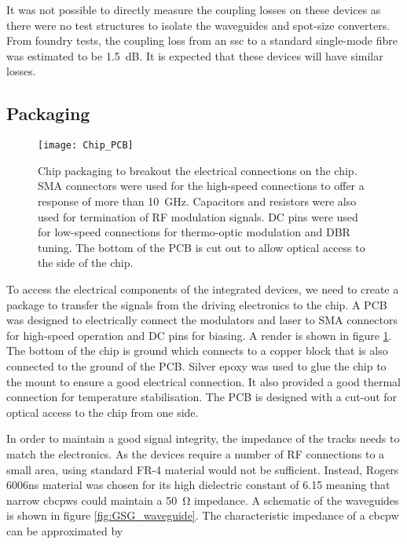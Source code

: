 It was not possible to directly measure the coupling losses on these devices as there were no test structures to isolate the waveguides and spot-size converters. From foundry tests, the coupling loss from an \ac{ssc} to a standard single-mode fibre was estimated to be \SI{1.5}{dB}. It is expected that these devices will have similar losses.

\subsection{Packaging}

\begin{figure}[t]
	\centering
	\texttt{[image: Chip\_PCB]}
	\caption[Transmitter PCB package]{Chip packaging to breakout the electrical connections on the chip. SMA connectors were used for the high-speed connections to offer a response of more than \SI{10}{\GHz}. Capacitors and resistors were also used for termination of RF modulation signals. DC pins were used for low-speed connections for thermo-optic modulation and \acl{DBR} tuning. The bottom of the PCB is cut out to allow optical access to the side of the chip.}
	\label{fig:chip_pcb}
\end{figure}

To access the electrical components of the integrated devices, we need to create a package to transfer the signals from the driving electronics to the chip. A PCB was designed to electrically connect the modulators and laser to SMA connectors for high-speed operation and DC pins for biasing. A render is shown in figure \ref{fig:chip_pcb}. The bottom of the chip is ground which connects to a copper block that is also connected to the ground of the PCB. Silver epoxy was used to glue the chip to the mount to ensure a good electrical connection. It also provided a good thermal connection for temperature stabilisation. The PCB is designed with a cut-out for optical access to the chip from one side.

In order to maintain a good signal integrity, the impedance of the tracks needs to match the electronics. As the devices require a number of RF connections to a small area, using standard FR-4 material would not be sufficient. Instead, Rogers 6006ns material was chosen for its high dielectric constant of \num{6.15} meaning that narrow \acp{cbcpw} could maintain a \SI{50}{\ohm} impedance. A schematic of the waveguides is shown in figure \ref{fig:GSG_waveguide}. The characteristic impedance of a \ac{cbcpw} can be approximated by \cite{wadell1991}

